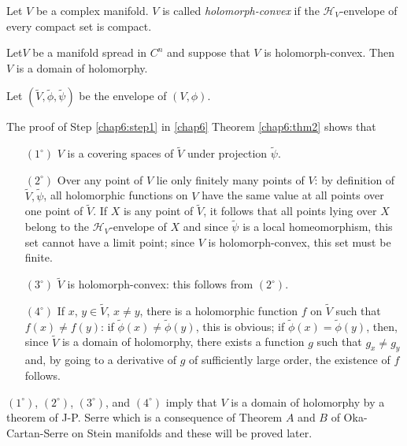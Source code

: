 \begin{defi*}
Let $V$ be a complex manifold. $V$ is called \textit{holomorph-convex}
if the $\mathscr{H}_V$-envelope of every compact set is compact. 
\end{defi*}

\begin{proposition}%
Let\pageoriginale $V$ be a manifold spread in $C^n$ and suppose that
$V$ is holomorph-convex. Then $V$ is a domain of holomorphy.

Let $(\tilde{V}, \tilde{\phi}, \tilde{\psi})$ be the envelope of $(V,
\phi)$. 

The proof of Step \ref{chap6:step1} in \ref{chap6} Theorem
\ref{chap6:thm2} shows that  
\begin{itemize}
\item[$(1^\circ)$] $V$ is a covering spaces of $\tilde{V}$ under
  projection $\tilde{\psi}$. 

\item[$(2^\circ)$] Over any point of $V$ lie only finitely many points
  of $V$: by definition of $\tilde{V}, \tilde{\psi}$, all holomorphic
  functions on $V$ have the same value at all points over one point of
  $\tilde{V}$. If $X$ is any point of $\tilde{V}$, it follows that all
  points lying over $X$ belong to the $\mathscr{H}_V$-envelope of $X$
  and since $\tilde{\psi}$ is a local homeomorphism, this set cannot
  have a limit point; since $V$ is holomorph-convex, this set must be
  finite. 

\item[$(3^\circ)$] $\tilde{V}$ is holomorph-convex: this follows from
  $(2^\circ)$. 

\item[$(4^\circ)$] If $x$, $y \in \tilde{V}$, $x \neq y$, there is a
  holomorphic function $f$ on $\tilde{V}$ such that $f(x) \neq f(y)$:
  if $\tilde{\phi} (x) \neq \tilde{\phi} (y)$, this is obvious; if
  $\tilde{\phi}(x) = \tilde{\phi}(y)$, then, since $\tilde{V}$ is a
  domain of holomorphy, there exists a function $g$ such that $g_x
  \neq g_y$ and, by going to a derivative of $g$ of sufficiently large
  order, the existence of $f$ follows. 
\end{itemize}
\end{proposition}

$(1^\circ)$, $(2^\circ)$, $(3^\circ)$, and $(4^\circ)$ imply that $V$
is a domain of holomorphy by a theorem of J-P. Serre
\cite[Chap. XX]{p1:key1} which is a consequence of Theorem $A$ and $B$ of
Oka-Cartan-Serre on Stein manifolds and these will be proved later. 



